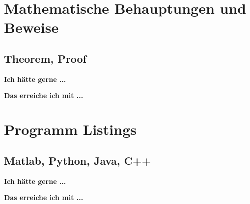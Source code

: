 \documentclass[twoside, 
               a4paper, 
               10pt, 
               parskip=full, 
               sectionentrydots=true, 
               listof=totoc, 
               listof=entryprefix,
               numbers=endperiod]{scrartcl}
\begin{document}

\newpage
\section{Mathematische Behauptungen und Beweise}
\subsection{Theorem, Proof}

{\textbf {Ich hätte gerne ...}}
 
\begin{miniSeite}[colbacktitle=black!35!white,title=Ausdruck]

\end{miniSeite}


\newpage
{\textbf {Das erreiche ich mit ...}}
 
\begin{miniSeite}[colbacktitle=black!35!white,title=\LaTeX-Code]

\end{miniSeite}





\newpage
\section{Programm Listings}
\subsection{Matlab, Python, Java, C++}

{\textbf {Ich hätte gerne ...}}
 
\begin{miniSeite}[colbacktitle=black!35!white,title=Ausdruck]

\end{miniSeite}


\newpage
{\textbf {Das erreiche ich mit ...}}
 
\begin{miniSeite}[colbacktitle=black!35!white,title=\LaTeX-Code]

\end{miniSeite}

\end{document}
